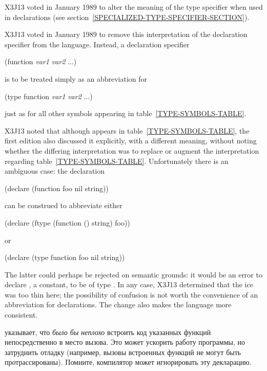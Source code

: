 \begin{flushdesc}
\begin{new}
X3J13 voted in January 1989
to alter the meaning of the
 type specifier when used in  declarations
(see section~\ref{SPECIALIZED-TYPE-SPECIFIER-SECTION}).
\end{new}


\begin{new}
X3J13 voted in January 1989
to remove this interpretation
of the  declaration specifier from the language.
Instead, a declaration specifier
\begin{lisp}
(function \emph{var1} \emph{var2} ...)
\end{lisp}
is to be treated simply as an abbreviation for
\begin{lisp}
(type function \emph{var1} \emph{var2} ...)
\end{lisp}
just as for all other symbols appearing in table~\ref{TYPE-SYMBOLS-TABLE}.

X3J13 noted that although  appears in
table~\ref{TYPE-SYMBOLS-TABLE}, the first edition also discussed it
explicitly, with a different meaning,
without noting whether the differing
interpretation was to replace or augment the
interpretation regarding table~\ref{TYPE-SYMBOLS-TABLE}.  Unfortunately
there is an ambiguous case: the declaration
\begin{lisp}
(declare (function foo nil string))
\end{lisp}
can be construed to abbreviate either
\begin{lisp}
(declare (ftype (function () string) foo))
\end{lisp}
or
\begin{lisp}
(declare (type function foo nil string))
\end{lisp}
The latter could perhaps be rejected on semantic grounds: it would be an
error to declare , a constant, to be of type .
In any case, X3J13 determined that the ice was too thin here;
the possibility of confusion is not worth the convenience of
an abbreviation for  declarations.
The change also makes the language more consistent.
\end{new}

\item[\cdf{inline}]
  указывает, что \emph{было бы
  неплохо} встроить код указанных функций непосредственно в место вызова.
Это может ускорить работу программы, но затруднить отладку (например, вызовы
встроенных функций не могут быть протрассированы).
Помните, компилятор может игнорировать эту декларацию.


\end{flushdesc}

